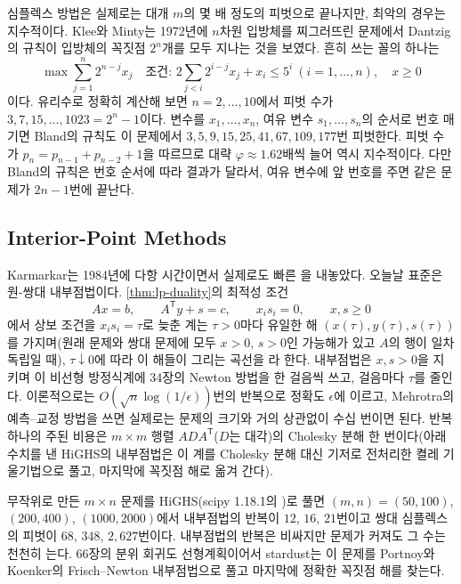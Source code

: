심플렉스 방법은 실제로는 대개 $m$의 몇 배 정도의 피벗으로 끝나지만, 최악의 경우는 지수적이다. Klee와 Minty는 1972년에 $n$차원 입방체를 찌그러뜨린 문제에서 Dantzig의 규칙이 입방체의 꼭짓점 $2^n$개를 모두 지나는 것을 보였다\cite{klee1972}. 흔히 쓰는 꼴의 하나는
\[
\max\sum_{j=1}^n2^{n-j}x_j\quad\text{조건: }2\sum_{j<i}2^{i-j}x_j+x_i\le5^i\ (i=1,\dots,n),\quad x\ge0
\]
이다. 유리수로 정확히 계산해 보면 $n=2,\dots,10$에서 피벗 수가 $3,7,15,\dots,1023=2^n-1$이다. 변수를 $x_1,\dots,x_n$, 여유 변수 $s_1,\dots,s_n$의 순서로 번호 매기면 Bland의 규칙도 이 문제에서 $3,5,9,15,25,41,67,109,177$번 피벗한다. 피벗 수가 $p_n=p_{n-1}+p_{n-2}+1$을 따르므로 대략 $\varphi\approx1.62$배씩 늘어 역시 지수적이다. 다만 Bland의 규칙은 번호 순서에 따라 결과가 달라서, 여유 변수에 앞 번호를 주면 같은 문제가 $2n-1$번에 끝난다.

\subsection{Interior-Point Methods}

Karmarkar는 1984년에 다항 시간이면서 실제로도 빠른 을 내놓았다\cite{karmarkar1984}. 오늘날 표준은 원-쌍대 내부점법이다\cite{wright1997pdipm}. \cref{thm:lp-duality}의 최적성 조건
\[
Ax=b,\qquad A^{\mathsf T}y+s=c,\qquad x_is_i=0,\qquad x,s\ge0
\]
에서 상보 조건을 $x_is_i=\tau$로 늦춘 계는 $\tau>0$마다 유일한 해 $(x(\tau),y(\tau),s(\tau))$를 가지며(원래 문제와 쌍대 문제에 모두 $x>0$, $s>0$인 가능해가 있고 $A$의 행이 일차 독립일 때), $\tau\downarrow0$에 따라 이 해들이 그리는 곡선을 라 한다. 내부점법은 $x,s>0$을 지키며 이 비선형 방정식계에 34장의 Newton 방법을 한 걸음씩 쓰고, 걸음마다 $\tau$를 줄인다. 이론적으로는 $O(\sqrt n\log(1/\epsilon))$번의 반복으로 정확도 $\epsilon$에 이르고, Mehrotra의 예측--교정 방법\cite{mehrotra1992}을 쓰면 실제로는 문제의 크기와 거의 상관없이 수십 번이면 된다. 반복 하나의 주된 비용은 $m\times m$ 행렬 $AD A^{\mathsf T}$($D$는 대각)의 Cholesky 분해 한 번이다(아래 수치를 낸 HiGHS의 내부점법은 이 계를 Cholesky 분해 대신 기저로 전처리한 켤레 기울기법으로 풀고, 마지막에 꼭짓점 해로 옮겨 간다).

무작위로 만든 $m\times n$ 문제를 HiGHS(scipy 1.18.1의 )로 풀면 $(m,n)=(50,100)$, $(200,400)$, $(1000,2000)$에서 내부점법의 반복이 $12$, $16$, $21$번이고 쌍대 심플렉스의 피벗이 $68$, $348$, $2{,}627$번이다. 내부점법의 반복은 비싸지만 문제가 커져도 그 수는 천천히 는다. 66장의 분위 회귀도 선형계획이어서 stardust는 이 문제를 Portnoy와 Koenker의 Frisch--Newton 내부점법으로 풀고\cite{portnoy1997} 마지막에 정확한 꼭짓점 해를 찾는다.

